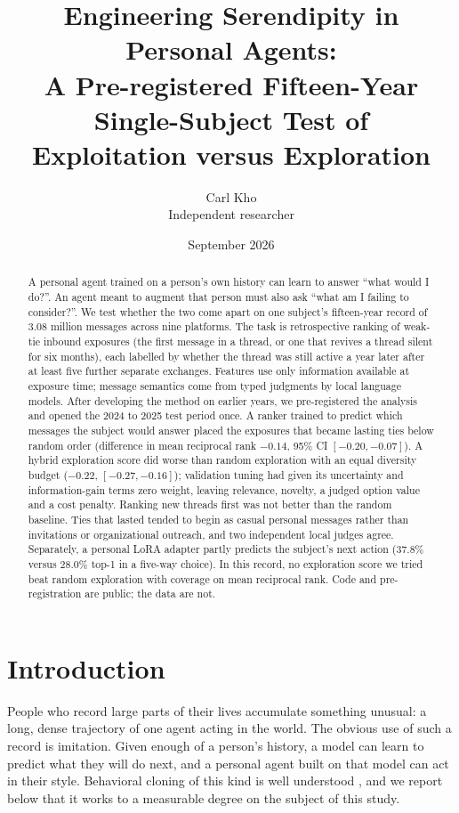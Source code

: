 \documentclass[11pt]{article}
\title{Engineering Serendipity in Personal Agents:\\
A Pre-registered Fifteen-Year Single-Subject Test of\\ Exploitation versus Exploration}
\author{Carl Kho\\ \small Independent researcher}
\date{September 2026}
\begin{document}
\maketitle

\begin{abstract}
A personal agent trained on a person's own history can learn to answer ``what would I do?''. An agent meant to augment that person must also ask ``what am I failing to consider?''. We test whether the two come apart on one subject's fifteen-year record of 3.08 million messages across nine platforms. The task is retrospective ranking of weak-tie inbound exposures (the first message in a thread, or one that revives a thread silent for six months), each labelled by whether the thread was still active a year later after at least five further separate exchanges. Features use only information available at exposure time; message semantics come from typed judgments by local language models. After developing the method on earlier years, we pre-registered the analysis and opened the 2024 to 2025 test period once. A ranker trained to predict which messages the subject would answer placed the exposures that became lasting ties below random order (difference in mean reciprocal rank $-0.14$, 95\% CI $[-0.20, -0.07]$). A hybrid exploration score did worse than random exploration with an equal diversity budget ($-0.22$, $[-0.27, -0.16]$); validation tuning had given its uncertainty and information-gain terms zero weight, leaving relevance, novelty, a judged option value and a cost penalty. Ranking new threads first was not better than the random baseline. Ties that lasted tended to begin as casual personal messages rather than invitations or organizational outreach, and two independent local judges agree. Separately, a personal LoRA adapter partly predicts the subject's next action (37.8\% versus 28.0\% top-1 in a five-way choice). In this record, no exploration score we tried beat random exploration with coverage on mean reciprocal rank. Code and pre-registration are public; the data are not.
\end{abstract}

\section{Introduction}

People who record large parts of their lives accumulate something unusual: a long, dense trajectory of one agent acting in the world. The obvious use of such a record is imitation. Given enough of a person's history, a model can learn to predict what they will do next, and a personal agent built on that model can act in their style. Behavioral cloning of this kind is well understood \citep{pomerleau1991efficient,ross2011reduction}, and we report below that it works to a measurable degree on the subject of this study.
\end{document}
